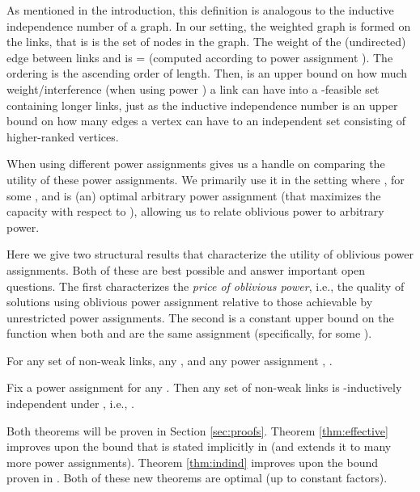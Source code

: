 \documentclass[11pt]{amsart}
\begin{document}
As mentioned in the introduction, this definition is analogous to the 
inductive independence number of a graph.
In our setting, the weighted graph is formed on the links, that is  is the set of nodes in the graph. The weight 
of the (undirected) edge between
links  and  is  =  (computed according to power assignment ). The ordering is the ascending
order of length. Then,  is an upper bound on how much
weight/interference (when using power ) a link can have into a -feasible set containing longer links, just as the 
inductive independence number is an upper bound on how many edges a vertex 
can have to an independent set consisting of higher-ranked vertices.

When using different power assignments  gives us a handle on comparing the utility of these power assignments. 
We primarily use it in the setting where ,
for some , and  is (an) optimal arbitrary power assignment (that maximizes the capacity with respect to ), 
allowing us to relate oblivious power to arbitrary power.

Here we give two structural results that characterize the utility of
oblivious power assignments. Both of these are best possible and
answer important open questions. The first characterizes the
\emph{price of oblivious power}, i.e., the quality of solutions using
oblivious power assignment relative to those achievable by
unrestricted power assignments. The second is a constant upper bound
on the function when both  and  are the same assignment
(specifically,  for some ).


\begin{theorem}
For any set  of non-weak links, any , and any power assignment , .
\label{thm:effective}
\end{theorem}
\iffalse
\begin{theorem}
Fix  for any . Then for any set of links  that are non-weak using ,

for \emph{any} power assignment .
\label{thm:effective}
\end{theorem}
\fi





\begin{theorem}
Fix a power assignment  for any . 
Then any set  of non-weak links is -inductively independent under , i.e., .
\label{thm:indind}
\end{theorem}
Both theorems will be proven in Section \ref{sec:proofs}.
Theorem \ref{thm:effective} improves upon the  bound that is stated implicitly in \cite{SODA11} (and extends it to many more power assignments). Theorem \ref{thm:indind} improves
upon the  bound proven in \cite{KV10}. Both of these new theorems are
optimal (up to constant factors).
\end{document}
